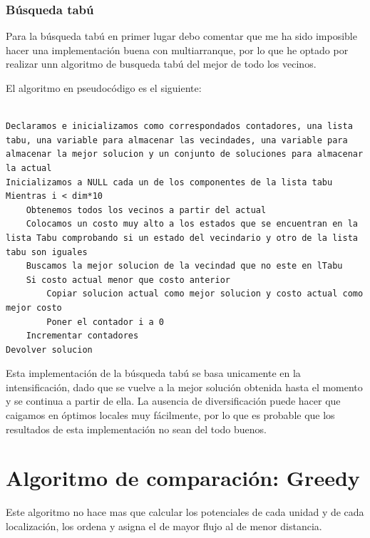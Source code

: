 \begin{itemize}
\begin{lstlisting}[language=SH]
\end{lstlisting}
		
		\end{itemize}	
		\subsubsection{Búsqueda tabú}
	
Para la búsqueda tabú en primer lugar debo comentar que me ha sido imposible hacer una implementación buena con multiarranque, por lo que he optado por realizar unn algoritmo de busqueda tabú del mejor de todo los vecinos. 

El algoritmo en pseudocódigo es el siguiente:

\begin{lstlisting}[language=SH]

Declaramos e inicializamos como correspondados contadores, una lista tabu, una variable para almacenar las vecindades, una variable para almacenar la mejor solucion y un conjunto de soluciones para almacenar la actual
Inicializamos a NULL cada un de los componentes de la lista tabu
Mientras i < dim*10
	Obtenemos todos los vecinos a partir del actual
	Colocamos un costo muy alto a los estados que se encuentran en la lista Tabu comprobando si un estado del vecindario y otro de la lista tabu son iguales
	Buscamos la mejor solucion de la vecindad que no este en lTabu
	Si costo actual menor que costo anterior
		Copiar solucion actual como mejor solucion y costo actual como mejor costo
		Poner el contador i a 0
	Incrementar contadores
Devolver solucion
\end{lstlisting}

Esta implementación de la búsqueda tabú se basa unicamente en la intensificación, dado que se vuelve a la mejor solución obtenida hasta el momento y se continua a partir de ella. La ausencia de diversificación puede hacer que caigamos en óptimos locales muy fácilmente, por lo que es probable que los resultados de esta implementación no sean del todo buenos.
\newpage
\section{Algoritmo de comparación: Greedy}
Este algoritmo no hace mas que calcular los potenciales de cada unidad y de cada localización, los ordena y asigna el de mayor flujo al de menor distancia.


